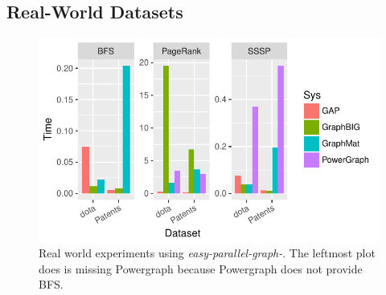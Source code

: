 \documentclass[conference]{IEEEtran}
\begin{document}
\subsection{Real-World Datasets}
\begin{figure}
	\centering
		\includegraphics[width=\linewidth, trim=0 18pt 6pt 0pt, clip]{graphics/compare-realworld.pdf}
	\caption{Real world experiments using \emph{easy-parallel-graph-\textasteriskcentered}. The leftmost plot does is missing Powergraph because Powergraph does not provide BFS.}
	\label{fig:epg-realworld}
\end{figure}
\end{document}
